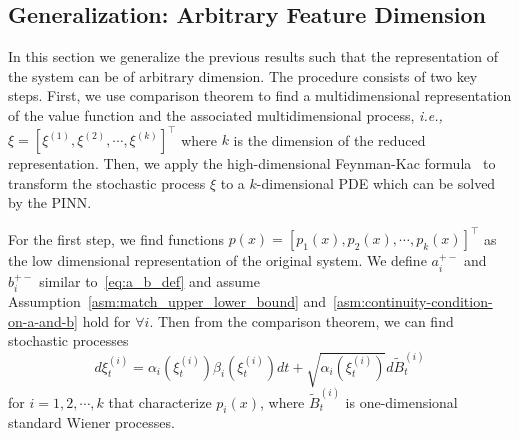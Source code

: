 \documentclass[letterpaper]{article} %
\newcommand{\ie}{\textit{i.e., }}
\begin{document}
\subsection{Generalization: Arbitrary Feature Dimension}
In this section we generalize the previous results such that the representation of the system can be of arbitrary dimension. The procedure consists of two key steps. First, we use comparison theorem to find a multidimensional representation of the value function and the associated multidimensional process, \ie $\xi = [\xi^{(1)}, \xi^{(2)}, \cdots, \xi^{(k)}]^\top$ where $k$ is the dimension of the reduced representation. Then, we apply the high-dimensional Feynman-Kac formula~\cite[Theorem 1.3.17]{pham2009continuous} to
transform the stochastic process $\xi$ to a $k$-dimensional PDE which can be solved by the PINN.

For the first step, we find functions $p(x) = [p_1(x), p_2(x), \cdots, p_k(x)]^\top$ as the low dimensional representation of the original system.
We define $a_i^{+-}$ and $b_i^{+-}$ similar to~\eqref{eq:a_b_def} and assume Assumption~\ref{asm:match_upper_lower_bound} and~\ref{asm:continuity-condition-on-a-and-b} hold for $\forall i$.
Then from the comparison theorem, we can find stochastic processes
\begin{equation}
\label{eq:xi_process_high_dim}
    d \xi^{(i)}_t=\alpha_i\left(\xi^{(i)}_t\right) \beta_i\left(\xi^{(i)}_t\right) d t+\sqrt{\alpha_i\left(\xi^{(i)}_t\right)} d \tilde{B}^{(i)}_t
\end{equation}
for $i = 1,2,\cdots, k$ that characterize $p_i(x)$, where $\tilde{B}^{(i)}_t$ is one-dimensional standard Wiener processes.
\end{document}

